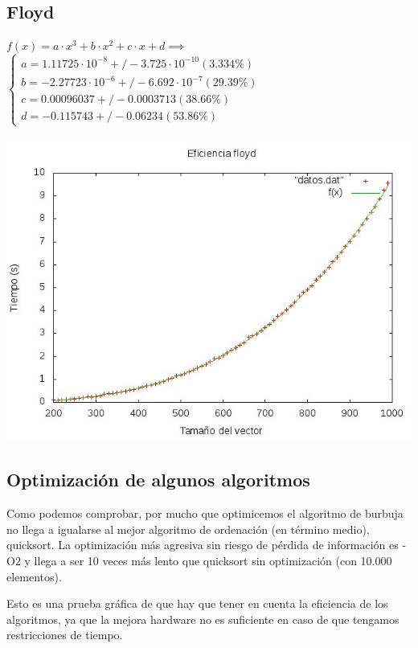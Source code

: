 \documentclass[11pt,spanish]{article} %
\begin{document}
\subsection{Floyd}
$f(x) = a\cdot x^3 + b\cdot x^2 + c\cdot x + d \implies$
$\left\{ \begin{array}{c}
a               = 1.11725\cdot 10^{-8}      +/- 3.725\cdot 10^{-10}    (3.334\%) \\
b               = -2.27723\cdot 10^{-6}     +/- 6.692\cdot 10^{-7}    (29.39\%) \\
c               = 0.00096037       +/- 0.0003713    (38.66\%) \\
d               = -0.115743        +/- 0.06234      (53.86\%)
\end{array}\right.$

\begin{center}
\includegraphics[scale=0.55]{../Graficas/Floyd/floydO0_ruben.jpeg}
\end{center}
\newpage

\subsection{Optimizaci\'on de algunos algoritmos}
Como podemos comprobar, por mucho que optimicemos el algoritmo de burbuja no llega a igualarse al mejor algoritmo de ordenación (en término medio), quicksort. La optimización más agresiva sin riesgo de pérdida de información es -O2 y llega a ser 10 veces más lento que quicksort sin optimización (con 10.000 elementos).

Esto es una prueba gráfica de que hay que tener en cuenta la eficiencia de los algoritmos, ya que la mejora hardware no es suficiente en caso de que tengamos restricciones de tiempo.
\end{document}

